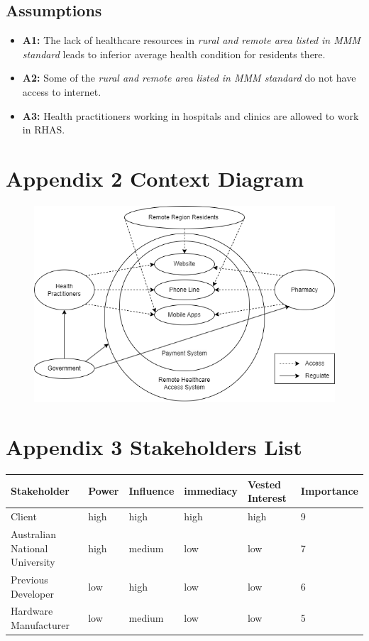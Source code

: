 \documentclass{article}
\begin{document}
\subsection{Assumptions}
\begin{itemize}[label={}]
\item \textbf{A1:} The lack of healthcare resources in \textit{rural and remote area listed in MMM standard} leads to inferior average health condition for residents there.
\item \textbf{A2:} Some of the \textit{rural and remote area listed in MMM standard} do not have access to internet.
\item \textbf{A3:} Health practitioners working in hospitals and clinics are allowed to work in RHAS.
\end{itemize}
\section{Appendix 2 Context Diagram}
\begin{figure}[h]
    \centering
    \includegraphics[scale=0.5]{Context Diagram}
    \label{1-2-a}
\end{figure}
\section{Appendix 3 Stakeholders List}
\begin{center}
\begin{tabular}{ | m{6em} | m{4em} | m{4em} | m{5em} | m{7em} | m{6em} | } 
  \hline
  Stakeholder & Power & Influence & immediacy & Vested Interest & Importance\\ 
  \hline
  Client & high & high & high & high & 9\\
  \hline
  Australian National University & high & medium & low & low & 7\\
  \hline
  Previous Developer & low & high & low & low & 6\\
  \hline
  Hardware Manufacturer & low & medium & low & low & 5\\
  \hline
\end{tabular}
\end{center}
\end{document}
